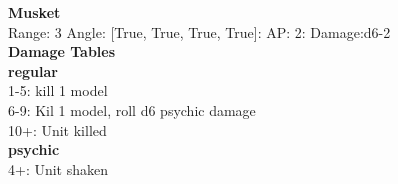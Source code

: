{\bf Musket } \\



Range: 3  Angle: [True, True, True, True]: AP: 2: Damage:d6-2 \\




 





{\bf Damage Tables} \\
 {\bf regular } \\
1-5: kill 1 model \\
6-9: Kil 1 model, roll d6 psychic damage \\
10+: Unit killed \\
 {\bf psychic } \\
4+: Unit shaken \\










\pagebreak
